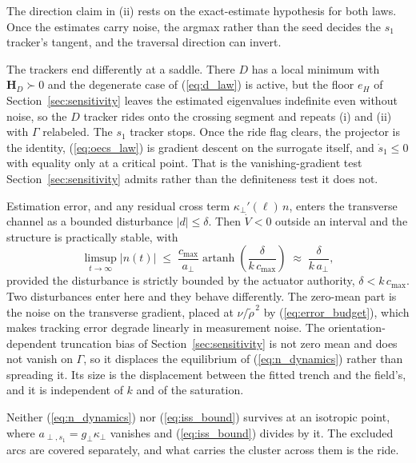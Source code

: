 \documentclass[lettersize,journal]{IEEEtran}
\begin{document}
The direction claim in (ii) rests on the exact-estimate hypothesis for
both laws. Once the estimates carry noise, the argmax rather than the
seed decides the $s_1$ tracker's tangent, and the traversal direction can
invert.

The trackers end differently at a saddle. There $D$ has a local minimum
with $\mathbf{H}_D \succ 0$ and the degenerate case of (\ref{eq:d_law})
is active, but the floor $e_H$ of Section~\ref{sec:sensitivity} leaves the
estimated eigenvalues indefinite even without noise, so the $D$ tracker
rides onto the crossing segment and repeats (i) and (ii) with $\Gamma$
relabeled. The $s_1$ tracker stops. Once the ride flag clears, the
projector is the identity, (\ref{eq:oecs_law}) is gradient descent on
the surrogate itself, and $\dot{s}_1 \leq 0$ with equality only at a
critical point. That is the vanishing-gradient test
Section~\ref{sec:sensitivity} admits rather than the definiteness test it does
not.

Estimation error, and any residual cross term $\kappa_\perp'(\ell)\,n$,
enters the transverse channel as a bounded disturbance $|d| \leq
\delta$. Then $\dot{V} < 0$ outside an interval and the structure is
practically stable, with
\begin{equation}
    \limsup_{t\to\infty}|n(t)| \;\leq\;
    \frac{c_{\max}}{a_\perp}
    \operatorname{artanh}\!\left(\frac{\delta}{k\,c_{\max}}\right)
    \;\approx\; \frac{\delta}{k\,a_\perp},
    \label{eq:iss_bound}
\end{equation}
provided the disturbance is strictly bounded by the actuator authority, $\delta < k\,c_{\max}$. Two disturbances enter here and they behave
differently. The zero-mean part is the noise on the transverse gradient,
placed at $\nu/\tilde{\rho}^{\,2}$ by (\ref{eq:error_budget}), which
makes tracking error degrade linearly in measurement noise. The
orientation-dependent truncation bias of
Section~\ref{sec:sensitivity} is not zero mean and does not vanish on
$\Gamma$, so it displaces the equilibrium of
(\ref{eq:n_dynamics}) rather than spreading it. Its size is the
displacement between the fitted trench and the field's, and it is
independent of $k$ and of the saturation.

Neither (\ref{eq:n_dynamics}) nor (\ref{eq:iss_bound}) survives at an
isotropic point, where $a_{\perp,s_1} = g_\perp\kappa_\perp$ vanishes and
(\ref{eq:iss_bound}) divides by it. The excluded arcs are covered
separately, and what carries the cluster across them is the ride.
\end{document}
